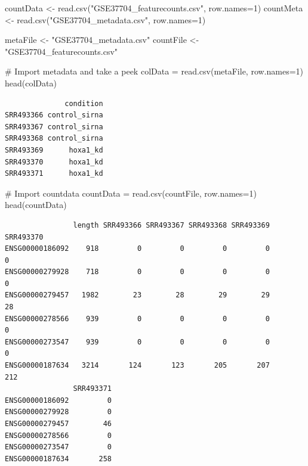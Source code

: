 \documentclass[
  letterpaper,
  DIV=11,
  numbers=noendperiod]{scrartcl}
\newenvironment{Shaded}{\begin{snugshade}}{\end{snugshade}}
\newcommand{\AttributeTok}[1]{\textcolor[rgb]{0.40,0.45,0.13}{#1}}
\newcommand{\CommentTok}[1]{\textcolor[rgb]{0.37,0.37,0.37}{#1}}
\newcommand{\DecValTok}[1]{\textcolor[rgb]{0.68,0.00,0.00}{#1}}
\newcommand{\FunctionTok}[1]{\textcolor[rgb]{0.28,0.35,0.67}{#1}}
\newcommand{\NormalTok}[1]{\textcolor[rgb]{0.00,0.23,0.31}{#1}}
\newcommand{\OtherTok}[1]{\textcolor[rgb]{0.00,0.23,0.31}{#1}}
\newcommand{\StringTok}[1]{\textcolor[rgb]{0.13,0.47,0.30}{#1}}
\begin{document}
\begin{Shaded}
\begin{Highlighting}[]
\NormalTok{countData }\OtherTok{\textless{}{-}} \FunctionTok{read.csv}\NormalTok{(}\StringTok{"GSE37704\_featurecounts.csv"}\NormalTok{, }\AttributeTok{row.names=}\DecValTok{1}\NormalTok{)}
\NormalTok{countMeta }\OtherTok{\textless{}{-}} \FunctionTok{read.csv}\NormalTok{(}\StringTok{"GSE37704\_metadata.csv"}\NormalTok{, }\AttributeTok{row.names=}\DecValTok{1}\NormalTok{)}
\end{Highlighting}
\end{Shaded}

\begin{Shaded}
\begin{Highlighting}[]
\NormalTok{metaFile }\OtherTok{\textless{}{-}} \StringTok{"GSE37704\_metadata.csv"}
\NormalTok{countFile }\OtherTok{\textless{}{-}} \StringTok{"GSE37704\_featurecounts.csv"}

\CommentTok{\# Import metadata and take a peek}
\NormalTok{colData }\OtherTok{=} \FunctionTok{read.csv}\NormalTok{(metaFile, }\AttributeTok{row.names=}\DecValTok{1}\NormalTok{)}
\FunctionTok{head}\NormalTok{(colData)}
\end{Highlighting}
\end{Shaded}

\begin{verbatim}
              condition
SRR493366 control_sirna
SRR493367 control_sirna
SRR493368 control_sirna
SRR493369      hoxa1_kd
SRR493370      hoxa1_kd
SRR493371      hoxa1_kd
\end{verbatim}

\begin{Shaded}
\begin{Highlighting}[]
\CommentTok{\# Import countdata}
\NormalTok{countData }\OtherTok{=} \FunctionTok{read.csv}\NormalTok{(countFile, }\AttributeTok{row.names=}\DecValTok{1}\NormalTok{)}
\FunctionTok{head}\NormalTok{(countData)}
\end{Highlighting}
\end{Shaded}

\begin{verbatim}
                length SRR493366 SRR493367 SRR493368 SRR493369 SRR493370
ENSG00000186092    918         0         0         0         0         0
ENSG00000279928    718         0         0         0         0         0
ENSG00000279457   1982        23        28        29        29        28
ENSG00000278566    939         0         0         0         0         0
ENSG00000273547    939         0         0         0         0         0
ENSG00000187634   3214       124       123       205       207       212
                SRR493371
ENSG00000186092         0
ENSG00000279928         0
ENSG00000279457        46
ENSG00000278566         0
ENSG00000273547         0
ENSG00000187634       258
\end{verbatim}
\end{document}
